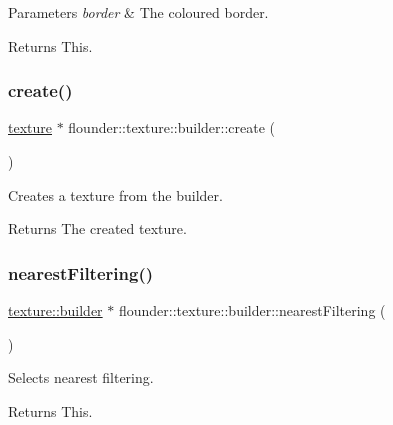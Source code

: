 \begin{DoxyParams}{Parameters}
{\em border} & The coloured border. \\
\hline
\end{DoxyParams}
\begin{DoxyReturn}{Returns}
This. 
\end{DoxyReturn}
\mbox{\label{classflounder_1_1texture_1_1builder_a6ac034708fc31a0b38c0ba0f0af688f7}} 
\subsubsection{\texorpdfstring{create()}{create()}}
{\footnotesize\ttfamily \hyperlink{classflounder_1_1texture}{texture} $\ast$ flounder\+::texture\+::builder\+::create (\begin{DoxyParamCaption}{ }\end{DoxyParamCaption})}



Creates a texture from the builder. 

\begin{DoxyReturn}{Returns}
The created texture. 
\end{DoxyReturn}
\mbox{\label{classflounder_1_1texture_1_1builder_a79f551a20e6327a2f011da83e48236e6}} 
\subsubsection{\texorpdfstring{nearest\+Filtering()}{nearestFiltering()}}
{\footnotesize\ttfamily \hyperlink{classflounder_1_1texture_1_1builder}{texture\+::builder} $\ast$ flounder\+::texture\+::builder\+::nearest\+Filtering (\begin{DoxyParamCaption}{ }\end{DoxyParamCaption})}



Selects nearest filtering. 

\begin{DoxyReturn}{Returns}
This. 
\end{DoxyReturn}
\mbox{\label{classflounder_1_1texture_1_1builder_aaf06c461f3292f734deb56b9bd931f1e}} 

